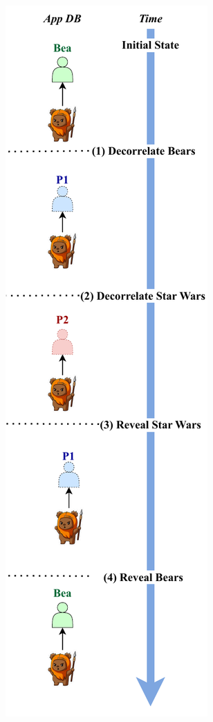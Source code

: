 %
\begin{figure}
    \centering
    \begin{subfigure}[t]{.47\columnwidth}
    \centering
    \includegraphics[width=.75\textwidth]{figs/composition-hl-inorder}

\end{subfigure}
\end{figure}
